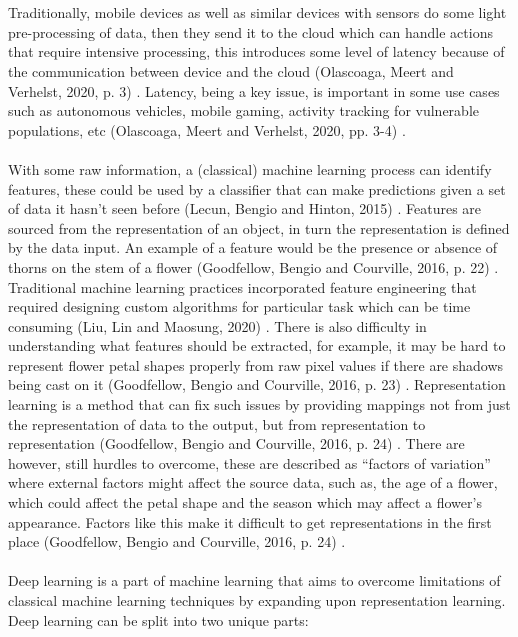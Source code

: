 \documentclass{article}
\begin{document}
\\
\\
Traditionally, mobile devices as well as similar devices with sensors do some light pre-processing of data, then they send it to the cloud which can handle actions that require intensive processing, this introduces some level of latency because of the communication between device and the cloud (Olascoaga, Meert and Verhelst, 2020, p. 3) \cite{Isabel}. Latency, being a key issue, is important in some use cases such as autonomous vehicles, mobile gaming, activity tracking for vulnerable populations, etc (Olascoaga, Meert and Verhelst, 2020, pp. 3-4) \cite{Isabel}.
\\
\\
With some raw information, a (classical) machine learning process can identify features, these could be used by a classifier that can make predictions given a set of data it hasn’t seen before (Lecun, Bengio and Hinton, 2015) \cite{LeCun}. Features are sourced from the representation of an object, in turn the representation is defined by the data input. An example of a feature would be the presence or absence of thorns on the stem of a flower (Goodfellow, Bengio and Courville, 2016, p. 22) \cite{Goodfellow}. Traditional machine learning practices incorporated feature engineering that required designing custom algorithms for particular task which can be time consuming (Liu, Lin and Maosung, 2020) \cite{Liu}. There is also difficulty in understanding what features should be extracted, for example, it may be hard to represent flower petal shapes properly from raw pixel values if there are shadows being cast on it (Goodfellow, Bengio and Courville, 2016, p. 23) \cite{Goodfellow}. Representation learning is a method that can fix such issues by providing mappings not from just the representation of data to the output, but from representation to representation (Goodfellow, Bengio and Courville, 2016, p. 24) \cite{Goodfellow}. There are however, still hurdles to overcome, these are described as “factors of variation” where external factors might affect the source data, such as, the age of a flower, which could affect the petal shape and the season which may affect a flower’s appearance. Factors like this make it difficult to get representations in the first place (Goodfellow, Bengio and Courville, 2016, p. 24) \cite{Goodfellow}.
\\
\\
Deep learning is a part of machine learning that aims to overcome limitations of classical machine learning techniques by expanding upon representation learning. Deep learning can be split into two unique parts: 
\end{document}
